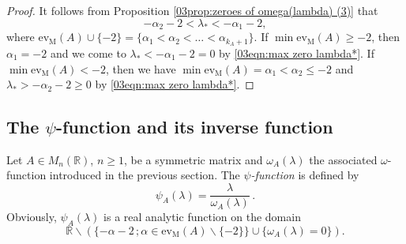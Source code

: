 \documentclass[12pt,a4paper]{article}
\newcommand{\1}{{\bm 1}}
\numberwithin{equation}{section}
\begin{document}
\begin{proof}
It follows from Proposition \ref{03prop:zeroes of omega(lambda) (3)}
that
%
\begin{equation}\label{03eqn:max zero lambda*}
-\alpha_{2}-2<\lambda_*<-\alpha_1-2,
\end{equation}
%
where $\mathrm{ev}_{\mathrm{M}}(A)\cup \{-2\}
=\{\alpha_1<\alpha_2<\dots<\alpha_{k_A+1}\}$.
If $\min\mathrm{ev}_{\mathrm{M}}(A)\ge -2$,
then $\alpha_1=-2$ and we come to $\lambda_*<-\alpha_1-2=0$
by \eqref{03eqn:max zero lambda*}.
If $\min\mathrm{ev}_{\mathrm{M}}(A)<-2$,
then we have
$\min\mathrm{ev}_{\mathrm{M}}(A)=\alpha_1<\alpha_2\le -2$
and $\lambda_*>-\alpha_{2}-2\ge0$ by \eqref{03eqn:max zero lambda*}.
\end{proof}


\subsection{The $\psi$-function and its inverse function}

Let $A\in M_n(\mathbb{R})$, $n\ge1$, be a symmetric matrix
and $\omega_A(\lambda)$ the associated $\omega$-function 
introduced in the previous section.
The \textit{$\psi$-function} is defined by
%
\begin{equation}\label{03eqn:def of psi(lambda)}
\psi_A(\lambda)=\frac{\lambda}{\omega_A(\lambda)}\,.
\end{equation}
%
Obviously, $\psi_A(\lambda)$ is a real analytic function on the domain
%
\begin{equation}\label{03eqn:original domain of psi}
\mathbb{R}\backslash 
(\{-\alpha-2\,;\alpha\in \mathrm{ev}_{\mathrm{M}}(A)\backslash\{-2\}\}
\cup \{\omega_A(\lambda)=0\}).
\end{equation}
%
\end{document}
